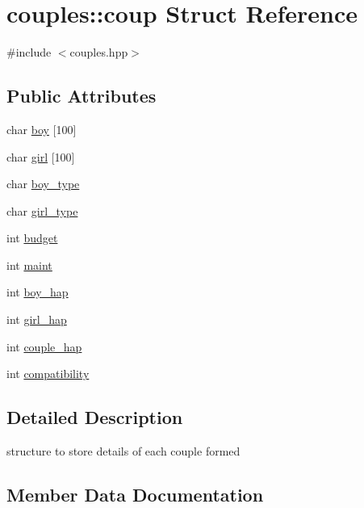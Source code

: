 \hypertarget{structcouples_1_1coup}{}\section{couples\+:\+:coup Struct Reference}
\label{structcouples_1_1coup}


{\ttfamily \#include $<$couples.\+hpp$>$}

\subsection*{Public Attributes}
\begin{DoxyCompactItemize}
\item 
char \hyperlink{structcouples_1_1coup_a1abe771ff67caf617ed329bd8d050c8d}{boy} \mbox{[}100\mbox{]}
\item 
char \hyperlink{structcouples_1_1coup_afeaf2b36af4d70a9d5c0fd74ce61935d}{girl} \mbox{[}100\mbox{]}
\item 
char \hyperlink{structcouples_1_1coup_a791c776c2945315ad8642f6e952444cf}{boy\+\_\+type}
\item 
char \hyperlink{structcouples_1_1coup_a759eaa52ac035a975169313dd84bd26a}{girl\+\_\+type}
\item 
int \hyperlink{structcouples_1_1coup_a120a74dc1b6ac737617e3820c5d8a818}{budget}
\item 
int \hyperlink{structcouples_1_1coup_a9668e063930614ca44a8ec91d74c9589}{maint}
\item 
int \hyperlink{structcouples_1_1coup_a1022dbc668dd1d74c2eb66ee08b5874c}{boy\+\_\+hap}
\item 
int \hyperlink{structcouples_1_1coup_a3fd317a4e47db20f4f6e2872a3200aca}{girl\+\_\+hap}
\item 
int \hyperlink{structcouples_1_1coup_a166c480dcb989b678baf48e6574420a7}{couple\+\_\+hap}
\item 
int \hyperlink{structcouples_1_1coup_ae7dc0f15ab9b211c11aa2e2e61e3800b}{compatibility}
\end{DoxyCompactItemize}


\subsection{Detailed Description}
structure to store details of each couple formed 

\subsection{Member Data Documentation}
\mbox{\label{structcouples_1_1coup_a1abe771ff67caf617ed329bd8d050c8d}} 
